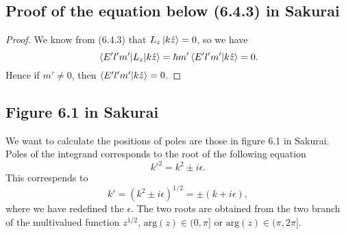 \documentclass[10pt]{article}
\begin{document}
	\subsection{Proof of the equation below (6.4.3) in Sakurai}
	\begin{proof}
		We know from (6.4.3) that $L_z \ket{k\hat{z}} = 0$, so we have
		\begin{equation}
			\mel{E'l'm'}{L_z}{k \hat{z}} = \hbar m' \braket{E'l'm'}{k\hat{z}} = 0.
		\end{equation}
		Hence if $m' \neq 0$, then $\braket{E'l'm'}{k\hat{z}} = 0$.
	\end{proof}

	\subsection{Figure 6.1 in Sakurai}
	We want to calculate the positions of poles are those in figure 6.1 in Sakurai. Poles of the integrand corresponds to the root of the following equation
	\begin{equation}
		k'^2 = k^2 \pm i \epsilon.
	\end{equation}
	This correspends to
	\begin{equation}
		k' = (k^2 \pm i \epsilon)^{1/2} = \pm (k + i \epsilon),
	\end{equation}
	where we have redefined the $\epsilon$. The two roots are obtained from the two branch of the multivalued function $z^{1/2}$, $\mathrm{arg}(z) \in (0, \pi]$ or $\mathrm{arg}(z) \in (\pi, 2\pi]$.
\end{document}
